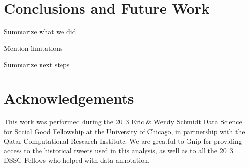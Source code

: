 \documentclass{article}
\begin{document}
\section{Conclusions and Future Work}
\begin{outline}
  \item Summarize what we did
  \item Mention limitations
  \item Summarize next steps
\end{outline}

\section{Acknowledgements}
This work was performed during the 2013 Eric \& Wendy Schmidt Data Science for
Social Good Fellowship at the University of Chicago, in partnership with the
Qatar Computational Research Institute. We are greatful to Gnip for providing
access to the historical tweets used in this analysis, as well as to all the
2013 DSSG Fellows who helped with data annotation.



\end{document}
